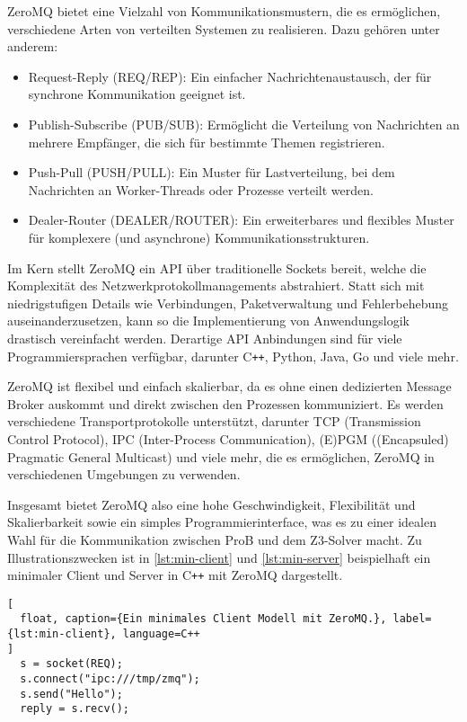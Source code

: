 ZeroMQ bietet eine Vielzahl von Kommunikationsmustern, die es ermöglichen, verschiedene Arten von verteilten Systemen zu realisieren.
Dazu gehören unter anderem:

\begin{itemize}
    \item Request-Reply (REQ/REP): Ein einfacher Nachrichtenaustausch, der für synchrone Kommunikation geeignet ist.
    \item Publish-Subscribe (PUB/SUB): Ermöglicht die Verteilung von Nachrichten an mehrere Empfänger, die sich für bestimmte Themen registrieren.
    \item Push-Pull (PUSH/PULL): Ein Muster für Lastverteilung, bei dem Nachrichten an Worker-Threads oder Prozesse verteilt werden.
    \item Dealer-Router (DEALER/ROUTER): Ein erweiterbares und flexibles Muster für komplexere (und asynchrone) Kommunikationsstrukturen.
\end{itemize}

Im Kern stellt ZeroMQ ein API über traditionelle Sockets bereit, welche die Komplexität des Netzwerkprotokollmanagements abstrahiert.
Statt sich mit niedrigstufigen Details wie Verbindungen, Paketverwaltung und Fehlerbehebung auseinanderzusetzen, kann so die Implementierung von Anwendungslogik drastisch vereinfacht werden.
Derartige API Anbindungen sind für viele Programmiersprachen verfügbar, darunter C\texttt{++}, Python, Java, Go und viele mehr.

ZeroMQ ist flexibel und einfach skalierbar, da es ohne einen dedizierten Message Broker auskommt und direkt zwischen den Prozessen kommuniziert.
Es werden verschiedene Transportprotokolle unterstützt, darunter TCP (Transmission Control Protocol), IPC (Inter-Process Communication), (E)PGM ((Encapsuled) Pragmatic General Multicast) und viele mehr, die es ermöglichen, ZeroMQ in verschiedenen Umgebungen zu verwenden.

Insgesamt bietet ZeroMQ also eine hohe Geschwindigkeit, Flexibilität und Skalierbarkeit sowie ein simples Programmierinterface,
was es zu einer idealen Wahl für die Kommunikation zwischen ProB und dem Z3-Solver macht.
Zu Illustrationszwecken ist in \cref{lst:min-client} und \cref{lst:min-server}  beispielhaft ein minimaler Client und Server in C\texttt{++} mit ZeroMQ dargestellt.

\begin{lstlisting}[
  float, caption={Ein minimales Client Modell mit ZeroMQ.}, label={lst:min-client}, language=C++
]
  s = socket(REQ);
  s.connect("ipc:///tmp/zmq");
  s.send("Hello");
  reply = s.recv();
\end{lstlisting}

